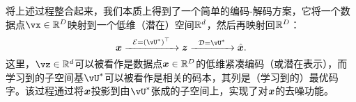 \documentclass[../../book-main.tex]{subfiles}
\begin{document}
将上述过程整合起来，我们本质上得到了一个简单的编码-解码方案，它将一个数据点$\vx \in \R^D$映射到一个低维（潜在）空间$\mathbb{R}^d$，然后再映射回$\mathbb{R}^D$：
\begin{equation}
\x \xrightarrow{\hspace{2mm} \mathcal{E} = (\vU^\ast)^\top \hspace{2mm}}  \z \xrightarrow{\hspace{2mm} \mathcal{D} = \vU^\ast \hspace{2mm}}   \hat{\x}.  
\label{eqn:autoencoding-PCA}
\end{equation}
这里，$\vz \in \R^d$可以被看作是数据点$\bm{x} \in \mathbb{R}^D$的低维紧凑编码（或潜在表示），而学习到的子空间基$\vU^\ast$可以被看作是相关的码本，其列是（学习到的）最优码字。该过程通过将$\bm{x}$投影到由$\vU^\ast$张成的子空间上，实现了对$\bm{x}$的去噪功能。
\end{document}
